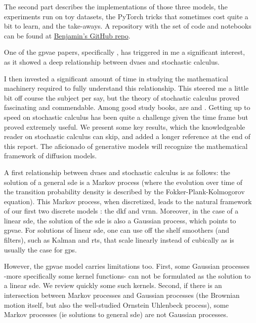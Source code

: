 The second part describes the implementations of those three models, the experiments run on toy datasets, the PyTorch tricks 
that sometimes cost quite a bit to learn, and the take-aways. A repository with the set of code and notebooks can be found 
at \href{https://github.com/BenjaminDeporte/MVA_Stage}{Benjamin's GitHub repo}.

One of the \gls{gpvae} papers, specifically \cite{zhu_markovian_2023}, has triggered in me a significant interest, as it showed a 
deep relationship between \glspl{dvae} and stochastic calculus.

I then invested a significant amount of time in studying the mathematical machinery required to fully understand this relationship. 
This steered me a little bit off course the subject per say, but the theory of stochastic calculus proved fascinating and commendable.
 Among good study books, are \cite{mouvement-brownien-calcul-ito} and \cite{sarkka_applied_2019}. Getting up to speed on stochastic calculus 
 has been quite a challenge given the time frame but proved extremely useful. We present some key results, which the knowledgeable reader 
 on stochastic calculus can skip, and added a longer reference at the end of this report. The aficionado of generative models will recognize 
the mathematical framework of diffusion models.

A first relationship between \glspl{dvae} and stochastic calculus is as follows: the solution of a general \gls{sde} is a Markov process (where 
the evolution over time of the transition probability density is described by the Fokker-Plank-Kolmogorov equation). This Markov process, 
when discretized, leads to the natural framework of our first two discrete models : the \gls{dkf} and \gls{vrnn}. Moreover, 
in the case of a linear \gls{sde}, the solution of the \gls{sde} is also a Gaussian process, which points to \gls{gpvae}. For solutions of linear \gls{sde}, 
one can use off the shelf smoothers (and filters), such as Kalman and \gls{rts}, that scale linearly instead of cubically as is usually the case 
for \glspl{gp}.

However, the \gls{gpvae} model carries limitations too. First, some Gaussian processes -more specifically some kernel functions- 
can not be formulated as the solution to a linear \gls{sde}. We review quickly some such kernels. Second, if there is an intersection between Markov processes and 
Gaussian processes (the Brownian motion itself, but also the well-studied Ornstein Uhlenbeck process), some Markov processes 
(ie solutions to general \gls{sde}) are not Gaussian processes. 

